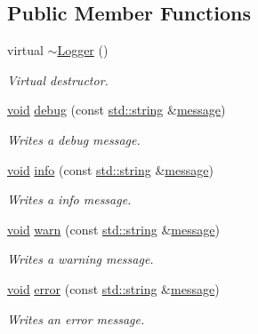 \subsection*{Public Member Functions}
\begin{DoxyCompactItemize}
\item 
virtual \hyperlink{class_assimp_1_1_logger_a27dd2bd4fd3b9cde0635ed22aad687c3}{$\sim$\-Logger} ()
\begin{DoxyCompactList}\small\item\em Virtual destructor. \end{DoxyCompactList}\item 
\hyperlink{wglew_8h_aeea6e3dfae3acf232096f57d2d57f084}{void} \hyperlink{class_assimp_1_1_logger_af978b5a592fef74ec3b5634ebdf22a3b}{debug} (const \hyperlink{glew_8h_ae84541b4f3d8e1ea24ec0f466a8c568b}{std\-::string} \&\hyperlink{glew_8h_a76333d9470ffdd4811326932394d36da}{message})
\begin{DoxyCompactList}\small\item\em Writes a debug message. \end{DoxyCompactList}\item 
\hyperlink{wglew_8h_aeea6e3dfae3acf232096f57d2d57f084}{void} \hyperlink{class_assimp_1_1_logger_a6774f0cc4373195ef899799a40ad9879}{info} (const \hyperlink{glew_8h_ae84541b4f3d8e1ea24ec0f466a8c568b}{std\-::string} \&\hyperlink{glew_8h_a76333d9470ffdd4811326932394d36da}{message})
\begin{DoxyCompactList}\small\item\em Writes a info message. \end{DoxyCompactList}\item 
\hyperlink{wglew_8h_aeea6e3dfae3acf232096f57d2d57f084}{void} \hyperlink{class_assimp_1_1_logger_afe0f9914014c7a62780a67557b9fc0d3}{warn} (const \hyperlink{glew_8h_ae84541b4f3d8e1ea24ec0f466a8c568b}{std\-::string} \&\hyperlink{glew_8h_a76333d9470ffdd4811326932394d36da}{message})
\begin{DoxyCompactList}\small\item\em Writes a warning message. \end{DoxyCompactList}\item 
\hyperlink{wglew_8h_aeea6e3dfae3acf232096f57d2d57f084}{void} \hyperlink{class_assimp_1_1_logger_a42b564d43664bb9fdc72613aa3e54770}{error} (const \hyperlink{glew_8h_ae84541b4f3d8e1ea24ec0f466a8c568b}{std\-::string} \&\hyperlink{glew_8h_a76333d9470ffdd4811326932394d36da}{message})
\begin{DoxyCompactList}\small\item\em Writes an error message. \end{DoxyCompactList}\item 

\end{DoxyCompactItemize}

